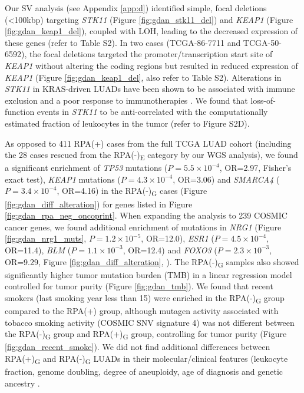 \documentclass[phd,tocprelim]{cornell}
\begin{document}
Our SV analysis (see Appendix \ref{app:d}) identified simple, focal deletions (<100kbp) targeting \textit{STK11} (Figure \ref{fig:gdan_stk11_del}) and \textit{KEAP1} (Figure \ref{fig:gdan_keap1_del}), coupled with LOH, leading to the decreased expression of these genes (refer to \cite{Carrot-Zhang2020-vl} Table S2). In two cases (TCGA-86-7711 and TCGA-50-6592), the focal deletions targeted the promoter/transcription start site of \textit{KEAP1} without altering the coding regions but resulted in reduced expression of \textit{KEAP1} (Figure \ref{fig:gdan_keap1_del}, also refer to \cite{Carrot-Zhang2020-vl} Table S2). Alterations in \textit{STK11} in KRAS-driven LUADs have been shown to be associated with immune exclusion and a poor response to immunotherapies \cite{Skoulidis2018-be}. We found that loss-of-function events in \textit{STK11} to be anti-correlated with the computationally estimated fraction of leukocytes in the tumor (refer to \cite{Carrot-Zhang2020-vl} Figure S2D). %

As opposed to 411 RPA(+) cases from the full TCGA LUAD cohort (including the 28 cases rescued from the RPA(-)\textsubscript{E} category by our WGS analysis), we found a significant enrichment of \textit{TP53} mutations ($P=5.5 \times 10^{-4}$, OR=2.97, Fisher's exact test), \textit{KEAP1} mutations ($P=4.3 \times 10^{-4}$, OR=3.06) and \textit{SMARCA4} ($P=3.4 \times 10^{-4}$, OR=4.16) in the RPA(-)\textsubscript{G} cases (Figure \ref{fig:gdan_diff_alteration}) for genes listed in Figure \ref{fig:gdan_rpa_neg_oncoprint}. When expanding the analysis to 239 COSMIC cancer genes, we found additional enrichment of mutations in \textit{NRG1} (Figure \ref{fig:gdan_nrg1_muts}, $P=1.2 \times 10^{-5}$, OR=12.0), \textit{ESR1} ($P=4.5 \times 10^{-4}$, OR=11.4), \textit{BLM} ($P=1.1 \times 10^{-3}$, OR=12.4) and \textit{FOXO3} ($P=2.3 \times 10^{-3}$, OR=9.29, Figure \ref{fig:gdan_diff_alteration}, ). The RPA(-)\textsubscript{G} samples also showed significantly higher tumor mutation burden (TMB) in a linear regression model controlled for tumor purity (Figure \ref{fig:gdan_tmb}). We found that recent smokers (last smoking year less than 15) were enriched in the RPA(-)\textsubscript{G} group compared to the RPA(+) group, although mutagen activity associated with tobacco smoking activity (COSMIC SNV signature 4) was not different between the RPA(-)\textsubscript{G} group and RPA(+)\textsubscript{G} group, controlling for tumor purity (Figure \ref{fig:gdan_recent_smoke}). We did not find additional differences between RPA(+)\textsubscript{G} and RPA(-)\textsubscript{G} LUADs in their molecular/clinical features (leukocyte fraction, genome doubling, degree of aneuploidy, age of diagnosis and genetic ancestry \cite{Carrot-Zhang2020-vl}.
\end{document}
